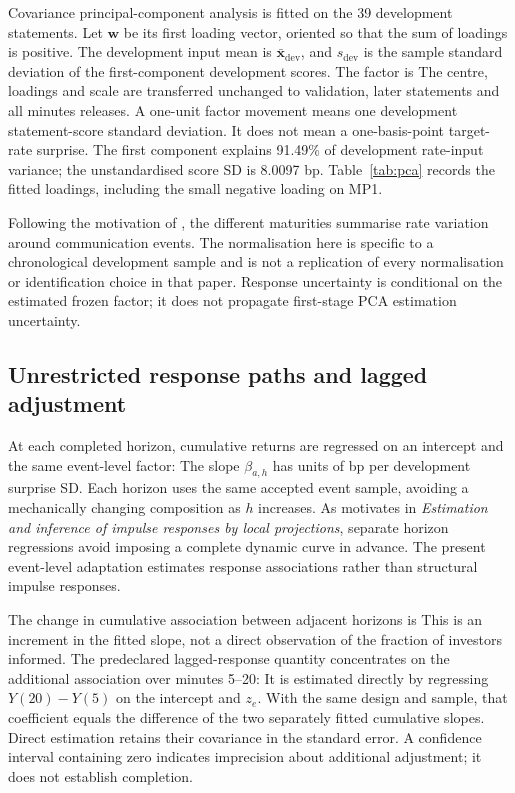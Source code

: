 Covariance principal-component analysis is fitted on the 39 development statements. Let $\mathbf{w}$ be its first loading vector, oriented so that the sum of loadings is positive. The development input mean is $\bar{\mathbf{x}}_{\mathrm{dev}}$, and $s_{\mathrm{dev}}$ is the sample standard deviation of the first-component development scores. The factor is
The centre, loadings and scale are transferred unchanged to validation, later statements and all minutes releases. A one-unit factor movement means one development statement-score standard deviation. It does not mean a one-basis-point target-rate surprise. The first component explains 91.49\% of development rate-input variance; the unstandardised score SD is 8.0097 bp. Table~\ref{tab:pca} records the fitted loadings, including the small negative loading on MP1.


Following the motivation of , the different maturities summarise rate variation around communication events. The normalisation here is specific to a chronological development sample and is not a replication of every normalisation or identification choice in that paper. Response uncertainty is conditional on the estimated frozen factor; it does not propagate first-stage PCA estimation uncertainty.

\subsection{Unrestricted response paths and lagged adjustment}
At each completed horizon, cumulative returns are regressed on an intercept and the same event-level factor:
The slope $\beta_{a,h}$ has units of bp per development surprise SD. Each horizon uses the same accepted event sample, avoiding a mechanically changing composition as $h$ increases. As  motivates in \textit{Estimation and inference of impulse responses by local projections}, separate horizon regressions avoid imposing a complete dynamic curve in advance. The present event-level adaptation estimates response associations rather than structural impulse responses.

The change in cumulative association between adjacent horizons is
This is an increment in the fitted slope, not a direct observation of the fraction of investors informed. The predeclared lagged-response quantity concentrates on the additional association over minutes 5--20:
It is estimated directly by regressing $Y(20)-Y(5)$ on the intercept and $z_e$. With the same design and sample, that coefficient equals the difference of the two separately fitted cumulative slopes. Direct estimation retains their covariance in the standard error. A confidence interval containing zero indicates imprecision about additional adjustment; it does not establish completion.

